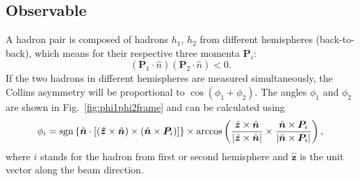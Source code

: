 
\subsection{Observable}
\label{sec:observable}
A hadron pair is composed of hadrons $h_1$, $h_2$ from different hemispheres (back-to-back), which means for their respective three momenta $\boldsymbol{P}_{i}$:
\begin{equation}
(\boldsymbol{P}_{1} \cdot \hat{n})(\boldsymbol{P}_{2}\cdot \hat{n}) < 0 .
\end{equation}
If the two hadrons in different hemispheres are measured simultaneously, the Collins asymmetry will be proportional to $\cos(\phi_1+\phi_2)$. The angles $\phi_1$ and $\phi_2$ are shown in Fig.~\ref{fig:phi1phi2frame} and can be calculated using
\begin{equation}
\phi_i=\operatorname{sgn}\left\lbrace\hat{\boldsymbol{n}}\cdot \left[ (\boldsymbol{\hat{z}}\times\hat{\boldsymbol{n}})\times(\hat{\boldsymbol{n}}\times{\boldsymbol{P}_{i}})\right] \right\rbrace\times \arccos\left(\frac{\hat{\boldsymbol{z}}\times\hat{\boldsymbol{n}}}{|\hat{\boldsymbol{z}}\times\hat{\boldsymbol{n}}|}\times\frac{\hat{\boldsymbol{n}}\times{\boldsymbol{P}_{i}}}{|\hat{\boldsymbol{n}}\times{\boldsymbol{P}_{i}}|}\right),
\label{eqn:collinsangledefine2}
\end{equation}
where $i$ stands for the hadron from first or second hemisphere and $\boldsymbol{\hat{z}}$ is the unit vector along the beam direction.

